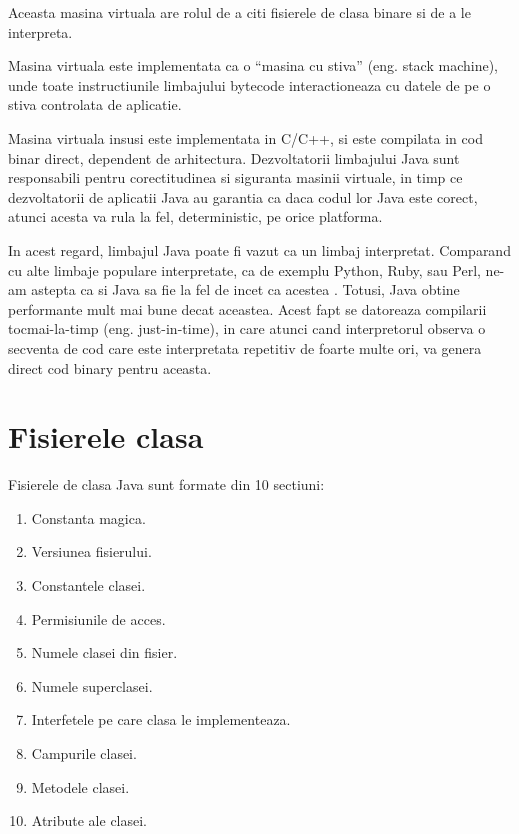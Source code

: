Aceasta masina virtuala are rolul de a citi fisierele de clasa binare si
de a le interpreta.

Masina virtuala este implementata ca o ``masina cu stiva'' (eng. stack
machine), unde toate instructiunile limbajului bytecode interactioneaza
cu datele de pe o stiva controlata de aplicatie.

Masina virtuala insusi este implementata in C/C++, si este compilata in
cod binar direct, dependent de arhitectura. Dezvoltatorii limbajului
Java sunt responsabili pentru corectitudinea si siguranta masinii
virtuale, in timp ce dezvoltatorii de aplicatii Java au garantia ca daca
codul lor Java este corect, atunci acesta va rula la fel, deterministic,
pe orice platforma.

In acest regard, limbajul Java poate fi vazut ca un limbaj interpretat.
Comparand cu alte limbaje populare interpretate, ca de exemplu Python,
Ruby, sau Perl, ne-am astepta ca si Java sa fie la fel de incet ca
acestea \cite{language_benchmarks}. Totusi, Java obtine performante mult mai bune decat
aceastea. Acest fapt se datoreaza compilarii tocmai-la-timp (eng.
just-in-time), in care atunci cand interpretorul observa o secventa de
cod care este interpretata repetitiv de foarte multe ori, va genera
direct cod binary pentru aceasta.

\section{Fisierele clasa}

Fisierele de clasa Java sunt formate din 10
sectiuni\cite{classfile_sections}:

\begin{enumerate}
	\item
	      Constanta magica.
	\item
	      Versiunea fisierului.
	\item
	      Constantele clasei.
	\item
	      Permisiunile de acces.
	\item
	      Numele clasei din fisier.
	\item
	      Numele superclasei.
	\item
	      Interfetele pe care clasa le implementeaza.
	\item
	      Campurile clasei.
	\item
	      Metodele clasei.
	\item
	      Atribute ale clasei.
\end{enumerate}

